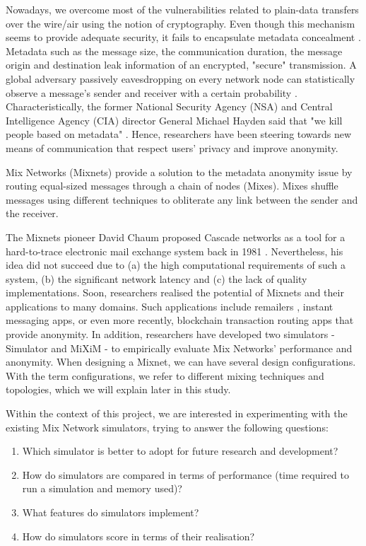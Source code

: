 \documentclass[logo,msc,cyber]{infthesis}   %
\begin{document}
Nowadays, we overcome most of the vulnerabilities related to plain-data
transfers over the wire/air using the notion of cryptography. Even though this
mechanism seems to provide adequate security, it fails to encapsulate metadata
concealment \cite{stallings2018computer}. Metadata such as the message size, the
communication duration, the message origin and destination leak information of
an encrypted, "secure" transmission. A global adversary passively eavesdropping
on every network node can statistically observe a message's sender and receiver
with a certain probability \cite{stallings2018computer}. Characteristically, the
former National Security Agency (NSA) \cite{nsa} and Central Intelligence Agency
(CIA) \cite{cia} director General Michael Hayden said that "we kill people based
on metadata" \cite{granick_2017}. Hence, researchers have been steering towards
new means of communication that respect users' privacy and improve anonymity.

Mix Networks (Mixnets) provide a solution to the metadata anonymity issue by
routing equal-sized messages through a chain of nodes (Mixes). Mixes shuffle
messages using different techniques to obliterate any link between the sender
and the receiver. 

The Mixnets pioneer David Chaum proposed Cascade networks as a tool for a
hard-to-trace electronic mail exchange system back in 1981
\cite{chaum1981untraceable}. Nevertheless, his idea did not succeed due to (a)
the high computational requirements of such a system, (b) the significant
network latency and (c) the lack of quality implementations\cite{ben2021mixim}.
Soon, researchers realised the potential of Mixnets and their applications to
many domains. Such applications include remailers \cite{remailers,mixmaster,
danezis2003mixminion}, instant messaging apps\cite{xx-netowrk-app}, or even more
recently, blockchain transaction routing apps that provide
anonymity\cite{diaz2021nym,xx-netowrk,hopr}. In addition, researchers have
developed two simulators\cite{simulator, mixim} - Simulator and MiXiM - to
empirically evaluate Mix Networks' performance and anonymity. When designing a
Mixnet, we can have several design configurations. With the term configurations,
we refer to different mixing techniques and topologies, which we will explain
later in this study.

Within the context of this project, we are interested in experimenting with the
existing Mix Network simulators, trying to answer the following questions:  

\begin{enumerate}
   \item Which simulator is better to adopt for future research and development?
   \item How do simulators are compared in terms of performance (time required to run a simulation and memory used)?
   \item What features do simulators implement?
   \item How do simulators score in terms of their realisation?
\end{enumerate}
 
\end{document}
